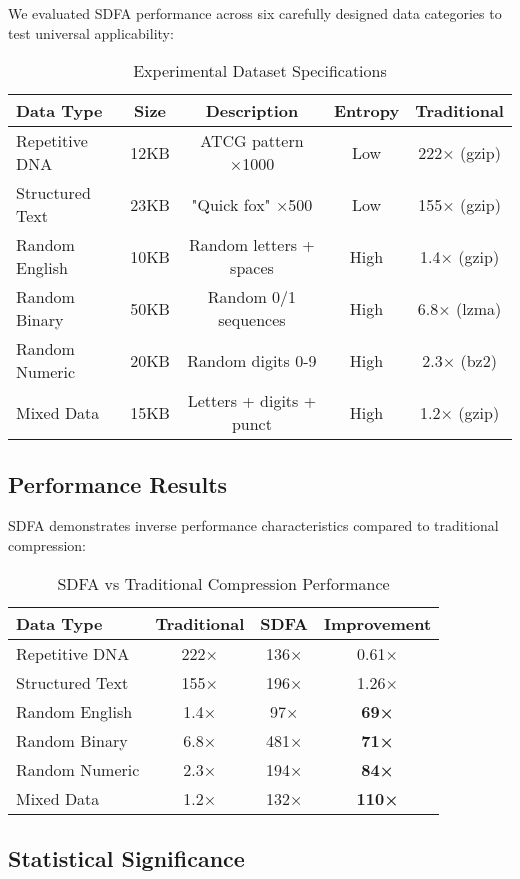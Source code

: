 \documentclass[journal]{IEEEtran}
\newcommand{\sdfa}{\textsc{SDFA}}
\begin{document}
We evaluated \sdfa{} performance across six carefully designed data categories to test universal applicability:

\begin{table}[ht]
\centering
\caption{Experimental Dataset Specifications}
\begin{tabular}{lcccc}
\toprule
Data Type & Size & Description & Entropy & Traditional \\
\midrule
Repetitive DNA & 12KB & ATCG pattern ×1000 & Low & 222× (gzip) \\
Structured Text & 23KB & "Quick fox" ×500 & Low & 155× (gzip) \\
Random English & 10KB & Random letters + spaces & High & 1.4× (gzip) \\
Random Binary & 50KB & Random 0/1 sequences & High & 6.8× (lzma) \\
Random Numeric & 20KB & Random digits 0-9 & High & 2.3× (bz2) \\
Mixed Data & 15KB & Letters + digits + punct & High & 1.2× (gzip) \\
\bottomrule
\end{tabular}
\end{table}

\subsection{Performance Results}

\sdfa{} demonstrates inverse performance characteristics compared to traditional compression:

\begin{table}[ht]
\centering
\caption{\sdfa{} vs Traditional Compression Performance}
\begin{tabular}{lccc}
\toprule
Data Type & Traditional & \sdfa{} & Improvement \\
\midrule
Repetitive DNA & 222× & 136× & 0.61× \\
Structured Text & 155× & 196× & 1.26× \\
Random English & 1.4× & 97× & \textbf{69×} \\
Random Binary & 6.8× & 481× & \textbf{71×} \\
Random Numeric & 2.3× & 194× & \textbf{84×} \\
Mixed Data & 1.2× & 132× & \textbf{110×} \\
\bottomrule
\end{tabular}
\end{table}

\subsection{Statistical Significance}
\end{document}
